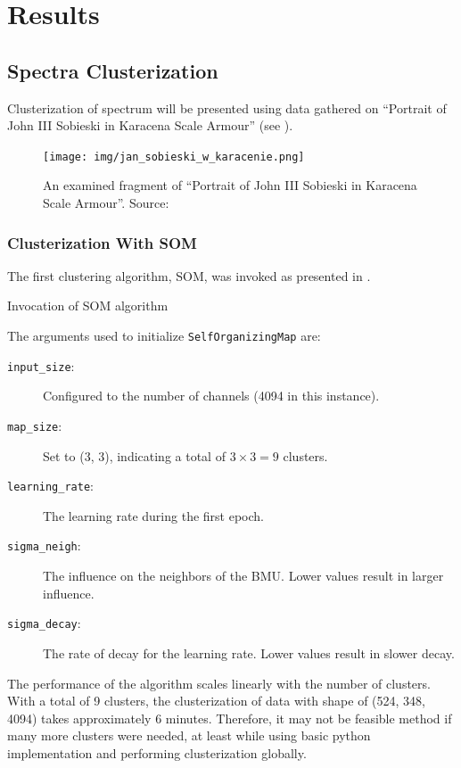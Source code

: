 \section{Results}
\subsection{Spectra Clusterization}
Clusterization of spectrum will be presented using data gathered on ``Portrait of John III Sobieski in Karacena Scale Armour'' (see ).
\begin{figure}[H] 
  \centering     
  \texttt{[image: img/jan\_sobieski\_w\_karacenie.png]} 
  \caption{An examined fragment of ``Portrait of John III Sobieski in Karacena Scale Armour''. Source: \cite{wikimediaSobieskiPortrai} }
  \label{fig:sobieski_fragment}
\end{figure}

\subsubsection{Clusterization With SOM}
The first clustering algorithm, SOM, was invoked as presented in .
\newenvironment{longlistingG}{\captionsetup{type=listing, width=0.8\textwidth}}{}
\begin{longlistingG}
    \caption{Invocation of SOM algorithm}
    \label{lst:som-invocation}
\end{longlistingG}
\vspace{12pt}

The arguments used to initialize \texttt{SelfOrganizingMap} are:
\begin{description}
    \item[\texttt{input\_size}:] Configured to the number of channels (4094 in this instance).
    \item[\texttt{map\_size}:] Set to (3, 3), indicating a total of $3 \times 3 = 9$ clusters.
    \item[\texttt{learning\_rate}:] The learning rate during the first epoch.
    \item[\texttt{sigma\_neigh}:] The influence on the neighbors of the BMU. Lower values result in larger influence.
    \item[\texttt{sigma\_decay}:] The rate of decay for the learning rate. Lower values result in slower decay.
\end{description}
The performance of the algorithm scales linearly with the number of clusters. 
With a total of 9 clusters, the clusterization of data with shape of (524, 348, 4094) takes approximately 6 minutes. 
Therefore, it may not be feasible method if many more clusters were needed, at least while using basic python implementation and performing clusterization globally.


